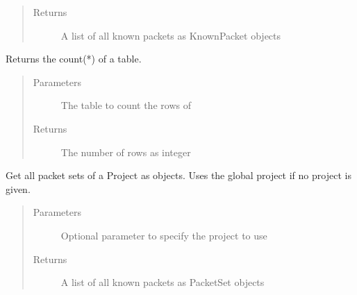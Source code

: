 \documentclass[letterpaper,10pt,english]{sphinxmanual}
\begin{document}
\begin{fulllineitems}
\begin{fulllineitems}
\begin{quote}
\begin{description}
\item[{Returns}] \leavevmode
A list of all known packets as KnownPacket objects

\end{description}\end{quote}

\end{fulllineitems}


\begin{fulllineitems}
\label{\detokenize{src:src.Database.Database.getOverallTableCount}}
Returns the count(*) of a table.
\begin{quote}\begin{description}
\item[{Parameters}] \leavevmode
{} \textendash{} The table to count the rows of

\item[{Returns}] \leavevmode
The number of rows as integer

\end{description}\end{quote}

\end{fulllineitems}


\begin{fulllineitems}
\label{\detokenize{src:src.Database.Database.getPacketSets}}
Get all packet sets of a Project as objects.
Uses the global project if no project is given.
\begin{quote}\begin{description}
\item[{Parameters}] \leavevmode
{} \textendash{} Optional parameter to specify the project to use

\item[{Returns}] \leavevmode
A list of all known packets as PacketSet objects

\end{description}\end{quote}

\end{fulllineitems}


\end{fulllineitems}
\end{document}
